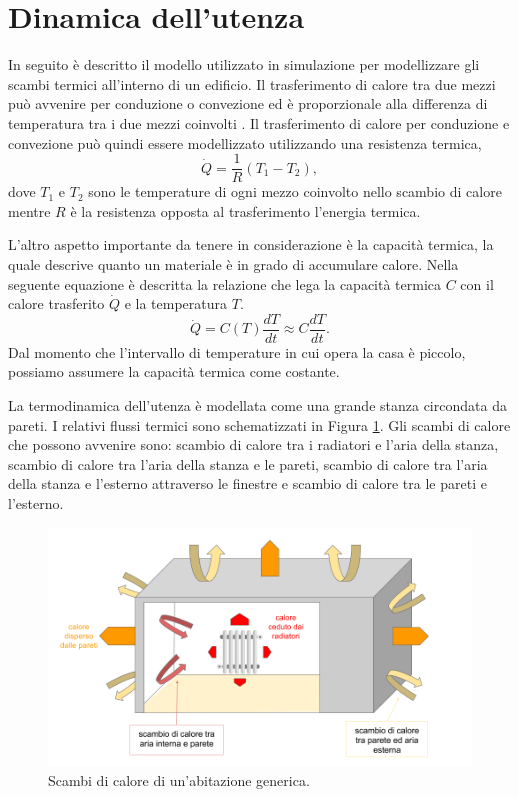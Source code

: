 \documentclass[laurea,oneside,11pt]{USiena_tesiLM3}
\begin{document}
\section{Dinamica dell'utenza}
\label{sec:dinamicautenza}
In seguito è descritto il modello utilizzato in simulazione per modellizzare gli scambi termici all'interno di un edificio. 
Il trasferimento di calore tra due mezzi può avvenire per conduzione o convezione ed è proporzionale alla differenza di temperatura tra i due mezzi coinvolti \cite{Beretti_ele}. Il trasferimento di calore per conduzione e convezione può quindi essere modellizzato utilizzando una resistenza termica,
\begin{equation}
\dot{Q} = \frac{1}{R} (T_1-T_2) ,
\label{eq:q1}
\end{equation}
dove $T_1$ e $T_2$ sono le temperature di ogni mezzo coinvolto nello scambio di calore mentre $R$ è la resistenza opposta al trasferimento l'energia termica.

L'altro aspetto importante da tenere in considerazione è la capacità termica, la quale descrive quanto un materiale  è in grado di accumulare calore. Nella seguente equazione è descritta la relazione che lega la capacità termica $C$ con il calore trasferito $\dot{Q}$ e la temperatura $T$.
\begin{equation}
\dot{Q} = C(T) \frac{dT}{dt} \approx C \frac{dT}{dt} .
\label{eq:q2}
\end{equation}
Dal momento che l'intervallo di temperature in cui opera la casa è piccolo, possiamo  assumere la capacità termica come costante.

La termodinamica dell'utenza è modellata come una grande stanza circondata da pareti. I relativi flussi termici sono schematizzati in Figura \ref{fig:scambio}. Gli scambi di calore che possono avvenire sono: scambio di calore tra i radiatori e l'aria della stanza, scambio di calore tra l'aria della stanza e le pareti, scambio di calore tra l'aria della stanza e l'esterno attraverso le finestre e scambio di calore tra le pareti e l'esterno.

\begin{figure}[h]
\begin{center}
\includegraphics[width=1.05\textwidth]{figure/scambio_casa}
\caption{Scambi di calore di un'abitazione generica.}
\label{fig:scambio}
\end{center}
\end{figure}
\end{document}
